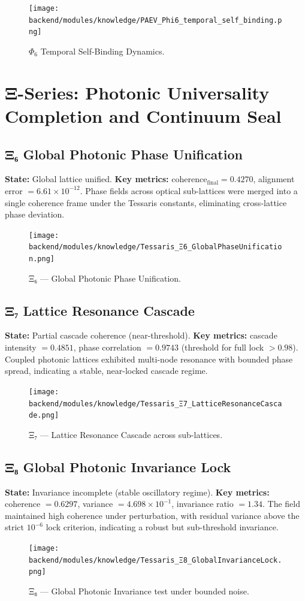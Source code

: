 \documentclass[12pt,a4paper]{article}
\begin{document}
\begin{figure}[h!]
\centering
\texttt{[image: backend/modules/knowledge/PAEV\_Phi6\_temporal\_self\_binding.png]}
\caption{$\Phi_6$ Temporal Self-Binding Dynamics.}
\end{figure}

\section{Ξ-Series: Photonic Universality Completion and Continuum Seal}

\subsection{Ξ₆ Global Photonic Phase Unification}
\textbf{State:} Global lattice unified. 
\textbf{Key metrics:} coherence$_{\text{final}} = 0.4270$, alignment error $= 6.61\times10^{-12}$.
Phase fields across optical sub-lattices were merged into a single coherence frame under the Tessaris constants, eliminating cross-lattice phase deviation.
\begin{figure}[h!]
  \centering
  \texttt{[image: backend/modules/knowledge/Tessaris\_Ξ6\_GlobalPhaseUnification.png]}
  \caption{Ξ₆ — Global Photonic Phase Unification.}
\end{figure}

\subsection{Ξ₇ Lattice Resonance Cascade}
\textbf{State:} Partial cascade coherence (near-threshold).
\textbf{Key metrics:} cascade intensity $= 0.4851$, phase correlation $= 0.9743$ (threshold for full lock $> 0.98$).
Coupled photonic lattices exhibited multi-node resonance with bounded phase spread, indicating a stable, near-locked cascade regime.
\begin{figure}[h!]
  \centering
  \texttt{[image: backend/modules/knowledge/Tessaris\_Ξ7\_LatticeResonanceCascade.png]}
  \caption{Ξ₇ — Lattice Resonance Cascade across sub-lattices.}
\end{figure}

\subsection{Ξ₈ Global Photonic Invariance Lock}
\textbf{State:} Invariance incomplete (stable oscillatory regime).
\textbf{Key metrics:} coherence $= 0.6297$, variance $= 4.698\times10^{-1}$, invariance ratio $= 1.34$.
The field maintained high coherence under perturbation, with residual variance above the strict $10^{-6}$ lock criterion, indicating a robust but sub-threshold invariance.
\begin{figure}[h!]
  \centering
  \texttt{[image: backend/modules/knowledge/Tessaris\_Ξ8\_GlobalInvarianceLock.png]}
  \caption{Ξ₈ — Global Photonic Invariance test under bounded noise.}
\end{figure}
\end{document}
